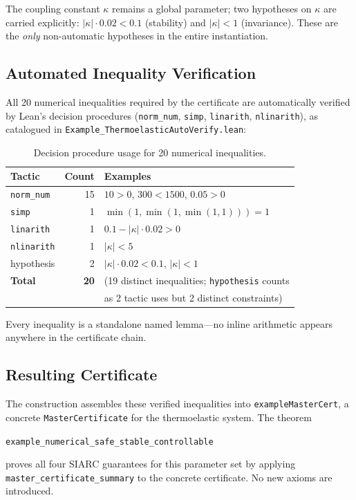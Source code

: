 \documentclass[11pt,a4paper]{article}
\theoremstyle{plain}
\theoremstyle{definition}
\theoremstyle{remark}
\newcommand{\abs}[1]{\lvert #1 \rvert}
\newcommand{\kk}{\kappa}
\newcommand{\leaninline}[1]{\texttt{#1}}
\begin{document}
The coupling constant $\kk$ remains a global parameter; two hypotheses
on $\kk$ are carried explicitly: $\abs{\kk} \cdot 0.02 < 0.1$ (stability)
and $\abs{\kk} < 1$ (invariance).  These are the \emph{only} non-automatic
hypotheses in the entire instantiation.

\subsection{Automated Inequality Verification}

All 20 numerical inequalities required by the certificate are
automatically verified by Lean's decision procedures
(\leaninline{norm\_num}, \leaninline{simp}, \leaninline{linarith},
\leaninline{nlinarith}), as catalogued in
\leaninline{Example\_ThermoelasticAutoVerify.lean}:

\begin{table}[ht]
\centering
\caption{Decision procedure usage for 20 numerical inequalities.}
\label{tab:auto}
\begin{tabular}{lrl}
\toprule
Tactic & Count & Examples \\
\midrule
\texttt{norm\_num} & 15 & $10 > 0$, $300 < 1500$, $0.05 > 0$ \\
\texttt{simp} & 1 & $\min(1, \min(1, \min(1, 1))) = 1$ \\
\texttt{linarith} & 1 & $0.1 - \abs{\kk} \cdot 0.02 > 0$ \\
\texttt{nlinarith} & 1 & $\abs{\kk} < 5$ \\
hypothesis & 2 & $\abs{\kk} \cdot 0.02 < 0.1$, $\abs{\kk} < 1$ \\
\midrule
\textbf{Total} & \textbf{20} & (19 distinct inequalities; \texttt{hypothesis} counts \\
 & & as 2 tactic uses but 2 distinct constraints) \\
\bottomrule
\end{tabular}
\end{table}

Every inequality is a standalone named lemma---no inline arithmetic
appears anywhere in the certificate chain.

\subsection{Resulting Certificate}

The construction assembles these verified inequalities into
\leaninline{exampleMasterCert}, a concrete
\leaninline{MasterCertificate} for the thermoelastic system.  The
theorem
\begin{center}
\leaninline{example\_numerical\_safe\_stable\_controllable}
\end{center}
proves all four SIARC guarantees for this parameter set by applying
\leaninline{master\_certificate\_summary} to the concrete certificate.
No new axioms are introduced.
\end{document}
